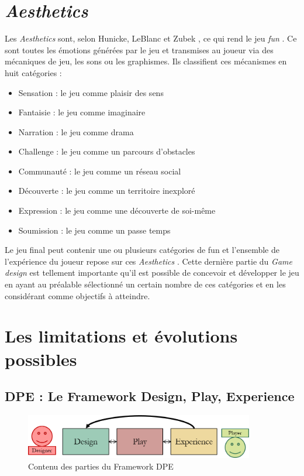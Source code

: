 \section{\emph{Aesthetics}}
Les \emph{Aesthetics} sont, selon Hunicke, LeBlanc et Zubek \cite{MDA_formal}, \guillemotleft ce qui rend le jeu \emph{fun} \guillemotright . Ce sont toutes les émotions générées par le jeu et transmises au joueur via des mécaniques de jeu, les sons ou les graphismes. Ils classifient ces mécanismes en huit catégories :
\begin{itemize}
    \item Sensation : le jeu comme plaisir des sens
    \item Fantaisie : le jeu comme imaginaire
    \item Narration : le jeu comme drama
    \item Challenge : le jeu comme un parcours d'obstacles
    \item Communauté : le jeu comme un réseau social
    \item Découverte : le jeu comme un territoire inexploré
    \item Expression : le jeu comme une découverte de soi-même
    \item Soumission : le jeu comme un passe temps
\end{itemize}

Le jeu final peut contenir une ou plusieurs catégories de \guillemotleft fun \guillemotright et l'ensemble de l'expérience du joueur repose sur ces \emph{Aesthetics} . Cette dernière partie du \emph{Game design} est tellement importante qu'il est possible de concevoir et développer le jeu en ayant au préalable sélectionné un certain nombre de ces catégories et en les considérant comme objectifs à atteindre.




\section{Les limitations et évolutions possibles}
\subsection{DPE : Le Framework Design, Play, Experience}

\begin{figure}[H]
    \centering
    \includegraphics[width=10cm]{10_img/chap3/dpe.png} 
    \caption{Contenu des parties du Framework DPE \cite{Winn2011}}
    \label{fig.dpe}
\end{figure}

